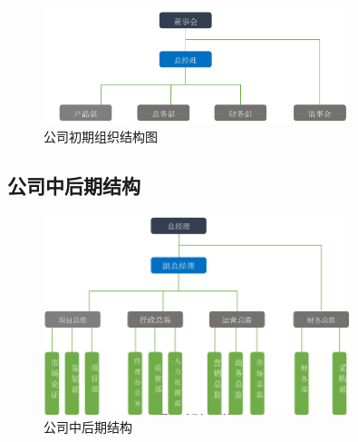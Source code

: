 \begin{figure}[htbp]
        \centering
        \includegraphics[width=0.8\textwidth]{../images/company/早期结构}
        \caption{公司初期组织结构图}
        \label{fig:early-struct}
\end{figure}


\subsection{公司中后期结构}
\begin{figure}[htbp]
        \centering
        \includegraphics[width=0.8\textwidth]{../images/company/后期结构}
        \caption{公司中后期结构}
        \label{fig:late-struct}
\end{figure}



